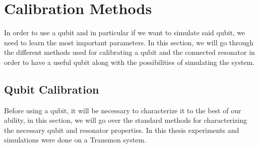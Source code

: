 \chapter{Calibration Methods}
In order to use a qubit and in particular if we want to simulate said qubit, we need to learn the most important parameters. In this section, we will go through the different methods used for calibrating a qubit and the connected resonator in order to have a useful qubit along with the possibilities of simulating the system.


\section{Qubit Calibration}
Before using a qubit, it will be necessary to characterize it to the best of our ability, in this section, we will go over the standard methods for characterizing the necessary qubit and resonator properties. In this thesis experiments and simulations were done on a Transmon system.

